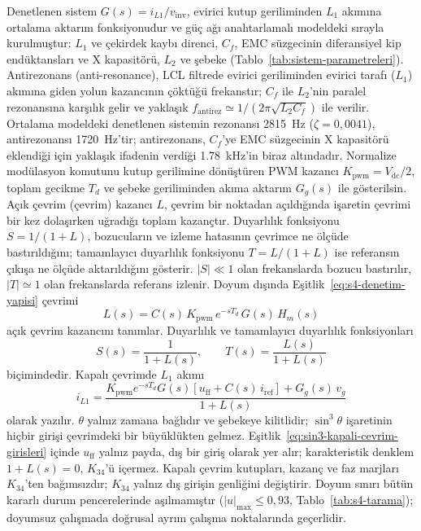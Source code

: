 Denetlenen sistem $G(s)=i_{L1}/v_{\mathrm{inv}}$, evirici kutup geriliminden $L_1$ akımına ortalama aktarım fonksiyonudur ve güç ağı anahtarlamalı modeldeki sırayla kurulmuştur: $L_1$ ve çekirdek kaybı direnci, $C_f$, EMC süzgecinin diferansiyel kip endüktansları ve X kapasitörü, $L_2$ ve şebeke (Tablo~\ref{tab:sistem-parametreleri}). Antirezonans (anti-resonance), LCL filtrede evirici geriliminden evirici tarafı ($L_1$) akımına giden yolun kazancının çöktüğü frekanstır; $C_f$ ile $L_2$'nin paralel rezonansına karşılık gelir ve yaklaşık $f_{\mathrm{antirez}}\simeq1/(2\pi\sqrt{L_2C_f})$ ile verilir. Ortalama modeldeki denetlenen sistemin rezonansı \SI{2815}{\hertz} ($\zeta=0{,}0041$), antirezonansı \SI{1720}{\hertz}'tir; antirezonans, $C_f$'ye EMC süzgecinin X kapasitörü eklendiği için yaklaşık ifadenin verdiği \SI{1.78}{\kilo\hertz}'in biraz altındadır. Normalize modülasyon komutunu kutup gerilimine dönüştüren PWM kazancı $K_{\mathrm{pwm}}=V_{\mathrm{dc}}/2$, toplam gecikme $T_d$ ve şebeke geriliminden akıma aktarım $G_g(s)$ ile gösterilsin. Açık çevrim (çevrim) kazancı $L$, çevrim bir noktadan açıldığında işaretin çevrimi bir kez dolaşırken uğradığı toplam kazançtır. Duyarlılık fonksiyonu $S=1/(1+L)$, bozucuların ve izleme hatasının çevrimce ne ölçüde bastırıldığını; tamamlayıcı duyarlılık fonksiyonu $T=L/(1+L)$ ise referansın çıkışa ne ölçüde aktarıldığını gösterir. $|S|\ll1$ olan frekanslarda bozucu bastırılır, $|T|\simeq1$ olan frekanslarda referans izlenir. Doyum dışında Eşitlik~\eqref{eq:s4-denetim-yapisi} çevrimi
\begin{equation}
  L(s)=C(s)\,K_{\mathrm{pwm}}\,e^{-sT_d}\,G(s)\,H_m(s)
  \label{eq:sin3-acik-cevrim}
\end{equation}
açık çevrim kazancını tanımlar. Duyarlılık ve tamamlayıcı duyarlılık fonksiyonları
\begin{equation}
  S(s)=\frac{1}{1+L(s)},
  \qquad
  T(s)=\frac{L(s)}{1+L(s)}
  \label{eq:sin3-duyarlilik}
\end{equation}
biçimindedir. Kapalı çevrimde $L_1$ akımı
\begin{equation}
  i_{L1}=\frac{K_{\mathrm{pwm}}e^{-sT_d}G(s)\left[u_{\mathrm{ff}}+C(s)\,i_{\mathrm{ref}}\right]+G_g(s)\,v_g}{1+L(s)}
  \label{eq:sin3-kapali-cevrim-girisleri}
\end{equation}
olarak yazılır. $\theta$ yalnız zamana bağlıdır ve şebekeye kilitlidir; $\sin^3\theta$ işaretinin hiçbir girişi çevrimdeki bir büyüklükten gelmez. Eşitlik~\eqref{eq:sin3-kapali-cevrim-girisleri} içinde $u_{\mathrm{ff}}$ yalnız payda, dış bir giriş olarak yer alır; karakteristik denklem $1+L(s)=0$, $K_{34}$'ü içermez. Kapalı çevrim kutupları, kazanç ve faz marjları $K_{34}$'ten bağımsızdır; $K_{34}$ yalnız dış girişin genliğini değiştirir. Doyum sınırı bütün kararlı durum pencerelerinde aşılmamıştır ($|u|_{\max}\leq0{,}93$, Tablo~\ref{tab:s4-tarama}); doyumsuz çalışmada doğrusal ayrım çalışma noktalarında geçerlidir.

